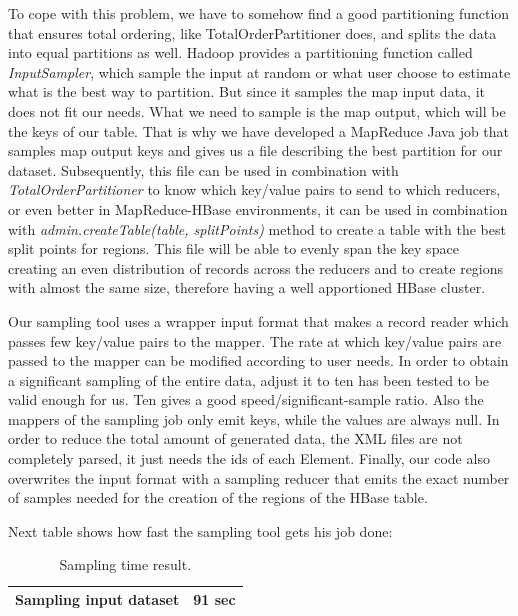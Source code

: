 To cope with this problem, we have to somehow find a good partitioning function that ensures total ordering, like TotalOrderPartitioner does, and splits the data into equal partitions as well. Hadoop provides a partitioning function called \textit{InputSampler}, which sample the input at random or what user choose to estimate what is the best way to partition. But since it samples the map input data, it does not fit our needs. What we need to sample is the map output, which will be the keys of our table. That is why we have developed a MapReduce Java job that samples map output keys and gives us a file describing the best partition for our dataset. Subsequently, this file can be used in combination with \textit{TotalOrderPartitioner} to know which key/value pairs to send to which reducers, or even better in MapReduce-HBase environments, it can be used in combination with \textit{admin.createTable(table, splitPoints)} method to create a table with the best split points for regions. This file will be able to evenly span the key space creating an even distribution of records across the reducers and to create regions with almost the same size, therefore having a well apportioned HBase cluster.
\par
Our sampling tool uses a wrapper input format that makes a record reader which passes few key/value pairs to the mapper. The rate at which key/value pairs are passed to the mapper can be modified according to user needs. In order to obtain a significant sampling of the entire data, adjust it to ten has been tested to be valid enough for us. Ten gives a good speed/significant-sample ratio. Also the mappers of the sampling job only emit keys, while the values are always null. In order to reduce the total amount of generated data, the XML files are not completely parsed, it just needs the ids of each Element. Finally, our code also overwrites the input format with a sampling reducer that emits the exact number of samples needed for the creation of the regions of the HBase table. 

\bigskip

Next table shows how fast the sampling tool gets his job done: 

\begin{table}[htbp]
\begin{center}
\begin{tabular}{|l|l|}
\hline
Sampling input dataset & 91 sec \\ \hline
\end{tabular}
\caption{Sampling time result.}
\end{center}
\label{Results}
\end{table}

